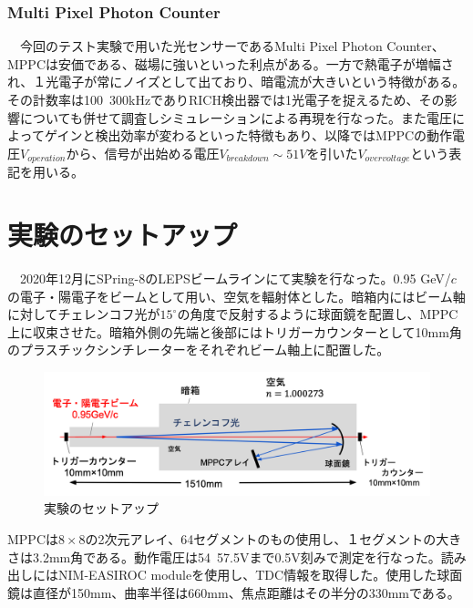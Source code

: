 \documentclass[uplatex, titlepage, dvipdfmx, 12pt, a4paper]{jsreport}
\begin{document}
\subsection{Multi Pixel Photon Counter}
　今回のテスト実験で用いた光センサーであるMulti Pixel Photon Counter、MPPCは安価である、磁場に強いといった利点がある。一方で熱電子が増幅され、１光電子が常にノイズとして出ており、暗電流が大きいという特徴がある。その計数率は100~300kHzでありRICH検出器では1光電子を捉えるため、その影響についても併せて調査しシミュレーションによる再現を行なった。また電圧によってゲインと検出効率が変わるといった特徴もあり、以降ではMPPCの動作電圧$V_{operation}$から、信号が出始める電圧$V_{breakdown}\sim51V$を引いた$V_{over voltage}$という表記を用いる。
\chapter{実験のセットアップ}
 　2020年12月にSPring-8のLEPSビームラインにて実験を行なった。0.95 GeV/$c$の電子・陽電子をビームとして用い、空気を輻射体とした。暗箱内にはビーム軸に対してチェレンコフ光が$15^\circ$の角度で反射するように球面鏡を配置し、MPPC上に収束させた。暗箱外側の先端と後部にはトリガーカウンターとして10mm角のプラスチックシンチレーターをそれぞれビーム軸上に配置した。
 
 \begin{figure}[htbp]
  \begin{center} 
    \includegraphics[clip, scale=0.6]{image/setup.png}
    \caption{実験のセットアップ}
    \label{fig:setup} 
  \end{center}
\end{figure}
MPPCは$8\times8$の2次元アレイ、64セグメントのもの使用し、１セグメントの大きさは3.2mm角である。動作電圧は54~57.5Vまで0.5V刻みで測定を行なった。読み出しにはNIM-EASIROC moduleを使用し、TDC情報を取得した。使用した球面鏡は直径が150mm、曲率半径は660mm、焦点距離はその半分の330mmである。
\end{document}
